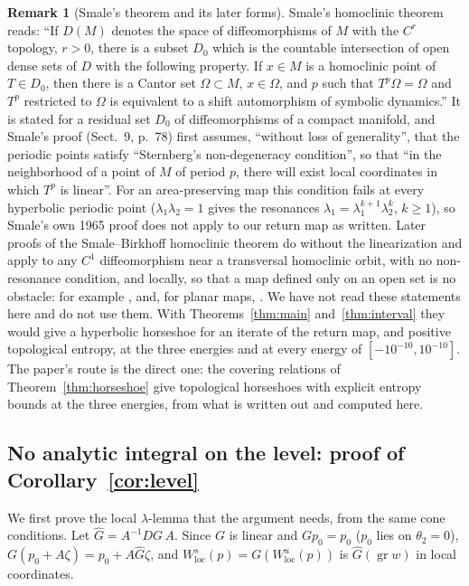 \documentclass[11pt]{article}
\theoremstyle{definition}
\newtheorem{remark}{Remark}
\begin{document}
\begin{remark}[Smale's theorem and its later forms]\label{rem:smale}
Smale's homoclinic theorem \cite[Thm.~B, p.~64]{smale1965} reads: ``If $D(M)$ denotes the space of diffeomorphisms of $M$ with the $C^r$ topology, $r > 0$, there is a subset $D_0$ which is the countable intersection of open dense sets of $D$ with the following property. If $x \in M$ is a homoclinic point of $T \in D_0$, then there is a Cantor set $\Omega \subset M$, $x \in \Omega$, and $p$ such that $T^p\Omega = \Omega$ and $T^p$ restricted to $\Omega$ is equivalent to a shift automorphism of symbolic dynamics.'' It is stated for a residual set $D_0$ of diffeomorphisms of a compact manifold, and Smale's proof (Sect.~9, p.~78) first assumes, ``without loss of generality'', that the periodic points satisfy ``Sternberg's non-degeneracy condition'', so that ``in the neighborhood of a point of $M$ of period $p$, there will exist local coordinates in which $T^p$ is linear''. For an area-preserving map this condition fails at every hyperbolic periodic point ($\lambda_1\lambda_2 = 1$ gives the resonances $\lambda_1 = \lambda_1^{k+1}\lambda_2^{k}$, $k \ge 1$), so Smale's own 1965 proof does not apply to our return map as written. Later proofs of the Smale--Birkhoff homoclinic theorem do without the linearization and apply to any $C^1$ diffeomorphism near a transversal homoclinic orbit, with no non-resonance condition, and locally, so that a map defined only on an open set is no obstacle: for example \cite[Thm.~6.5.5]{kh1995}, \cite[Ch.~2]{pt1993} and, for planar maps, \cite{moser1973}. We have not read these statements here and do not use them. With Theorems~\ref{thm:main} and~\ref{thm:interval} they would give a hyperbolic horseshoe for an iterate of the return map, and positive topological entropy, at the three energies and at every energy of $[-10^{-10}, 10^{-10}]$. The paper's route is the direct one: the covering relations of Theorem~\ref{thm:horseshoe} give topological horseshoes with explicit entropy bounds at the three energies, from what is written out and computed here.
\end{remark}

\subsection{No analytic integral on the level: proof of Corollary~\ref{cor:level}}\label{sec:kozlov}

We first prove the local $\lambda$-lemma that the argument needs, from the same cone conditions. Let $\hat G = A^{-1}DG\,A$. Since $G$ is linear and $Gp_0 = p_0$ ($p_0$ lies on $\theta_2 = 0$), $G(p_0 + A\zeta) = p_0 + A\hat G\zeta$, and $W^s_{\mathrm{loc}}(p) = G(W^u_{\mathrm{loc}}(p))$ is $\hat G(\operatorname{gr}w)$ in local coordinates.
\end{document}
